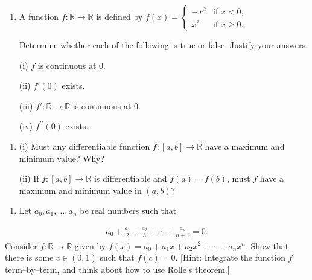 \documentclass[letterpaper,10pt,english]{jupyterBook}
\begin{document}
\label{\detokenize{Problems:id46}}\begin{enumerate}
%
\setcounter{enumi}{45}
\item {} 
\sphinxAtStartPar
A function \(f:\mathbb{R} \rightarrow \mathbb{R}\) is defined by \(f(x) = \begin{cases} -x^{2} & \text{if }x < 0,\\ x^{2} & \text{if }x \geq 0. \end{cases}\)

Determine whether each of the following is true or false. Justify your answers.

\sphinxAtStartPar
(i) \(f\) is continuous at \(0\).

\sphinxAtStartPar
(ii) \(f'(0)\) exists.

\sphinxAtStartPar
(iii) \(f':\mathbb{R}\to\mathbb{R}\) is continuous at \(0\).

\sphinxAtStartPar
(iv) \(f^{\prime \prime}(0)\) exists.

\end{enumerate}
\label{\detokenize{Problems:id47}}\begin{enumerate}
%
\setcounter{enumi}{46}
\item {} 
\sphinxAtStartPar
(i) Must any differentiable function \(f:[a, b] \rightarrow \mathbb{R}\) have a maximum and minimum value? Why?

\sphinxAtStartPar
(ii) If \(f:[a, b] \rightarrow \mathbb{R}\) is differentiable  and \(f(a) = f(b)\), must \(f\) have a maximum and minimum value in \((a, b)\)?

\end{enumerate}
\label{\detokenize{Problems:id48}}\begin{enumerate}
%
\setcounter{enumi}{47}
\item {} 
\sphinxAtStartPar
Let \(a_{0}, a_{1}, \ldots, a_{n}\) be real numbers such that

\end{enumerate}
\begin{equation*}
\begin{split}
a_{0} + \frac{a_{1}}{2} + \frac{a_{2}}{3} + \cdots + \frac{a_{n}}{n+1} = 0.
\end{split}
\end{equation*}
\sphinxAtStartPar
Consider \(f:\mathbb{R}\to\mathbb{R}\) given by \(f(x) = a_{0}+ a_{1}x + a_{2}x^{2} + \cdots + a_{n}x^{n}\). Show that there is some \(c\in (0,1)\) such that \(f(c)=0\). {[}Hint: Integrate the function \(f\) term–by–term, and think about how to use Rolle’s theorem.{]}
\end{document}
